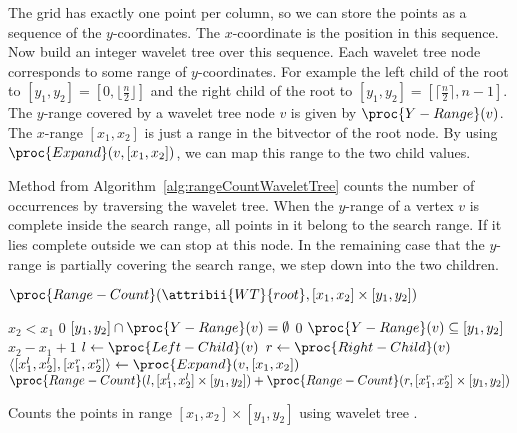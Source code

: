 \begin{Proof}
  The grid has exactly one point per column, so we can store the points as a sequence of the $y$-coordinates. The $x$-coordinate is the position in this sequence. Now build an integer wavelet tree  over this sequence. Each wavelet tree node corresponds to some range of $y$-coordinates. For example the left child of the root to $[y_1, y_2] = [0, \lfloor\frac{n}{2}\rfloor]$ and the right child of the root to $[y_1, y_2] = [\lceil\frac{n}{2}\rceil, n-1]$. The $y$-range covered by a wavelet tree node $v$ is given by $\proc{Y-Range}(v)$. The $x$-range $[x_1, x_2]$ is just a range in the bitvector of the root node. By using $\proc{Expand}(v, [x_1, x_2])$, we can map this range to the two child values.

  Method  from Algorithm~\ref{alg:rangeCountWaveletTree} counts the number of occurrences by traversing the wavelet tree. When the $y$-range of a vertex $v$ is complete inside the search range, all points in it belong to the search range. If it lies complete outside we can stop at this node. In the remaining case that the $y$-range is partially covering the search range, we step down into the two children.

  \begin{algorithm}[htb]
    \begin{codebox}
      \li \Return $\proc{Range-Count}(\attribii{WT}{root}, [x_1, x_2] \times [y_1, y_2])$
    \end{codebox}
    \vspace{1mm}
    \begin{codebox}
      \li \If $x_2 < x_1$
          \Then
      \li   \Return $0$
          \End
      \li \If $[y_1, y_2] \cap \proc{Y-Range}(v) = \emptyset$
          \Then
      \li   \Return $0$
          \End
      \li \If $\proc{Y-Range}(v) \subseteq [y_1, y_2]$
          \Then
      \li   \Return $x_2 - x_1 + 1$\label{line:wholeRangeCovered}
          \End
      \li $l \gets \proc{Left-Child}(v)$
      \li $r \gets \proc{Right-Child}(v)$
      \li $\langle [x_1^l, x_2^l], [x_1^r, x_2^r] \rangle \gets \proc{Expand}(v, [x_1, x_2])$
      \li \Return $\proc{Range-Count}(l, [x_1^l, x_2^l] \times [y_1, y_2]) + \proc{Range-Count}(r, [x_1^r, x_2^r] \times [y_1, y_2])$
    \end{codebox}
    \caption{Counts the points in range $[x_1, x_2] \times [y_1, y_2]$ using wavelet tree .}
    \label{alg:rangeCountWaveletTree}
  \end{algorithm}


\end{Proof}
